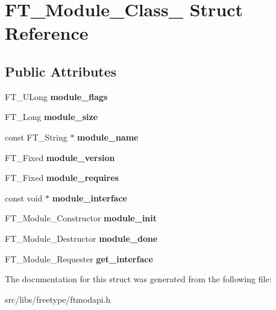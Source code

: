 \hypertarget{struct_f_t___module___class__}{
\section{FT\_\-Module\_\-Class\_\- Struct Reference}
\label{struct_f_t___module___class__}
}
\subsection*{Public Attributes}
\begin{DoxyCompactItemize}
\item 
\hypertarget{struct_f_t___module___class___a54a02a3767955cd8fa0cd786bd1f9515}{
FT\_\-ULong {\bfseries module\_\-flags}}
\label{struct_f_t___module___class___a54a02a3767955cd8fa0cd786bd1f9515}

\item 
\hypertarget{struct_f_t___module___class___a2582eeab364e4fbbd5d1e420bfcf3207}{
FT\_\-Long {\bfseries module\_\-size}}
\label{struct_f_t___module___class___a2582eeab364e4fbbd5d1e420bfcf3207}

\item 
\hypertarget{struct_f_t___module___class___af25b9e32b6c91e0c31560efb62886ed7}{
const FT\_\-String $\ast$ {\bfseries module\_\-name}}
\label{struct_f_t___module___class___af25b9e32b6c91e0c31560efb62886ed7}

\item 
\hypertarget{struct_f_t___module___class___a5b649f1965c42fd8c54bbc370fbf60b4}{
FT\_\-Fixed {\bfseries module\_\-version}}
\label{struct_f_t___module___class___a5b649f1965c42fd8c54bbc370fbf60b4}

\item 
\hypertarget{struct_f_t___module___class___a24772981bd972d342f54a6e1704f85c3}{
FT\_\-Fixed {\bfseries module\_\-requires}}
\label{struct_f_t___module___class___a24772981bd972d342f54a6e1704f85c3}

\item 
\hypertarget{struct_f_t___module___class___a320168f227e2d268691429ac0c6b2900}{
const void $\ast$ {\bfseries module\_\-interface}}
\label{struct_f_t___module___class___a320168f227e2d268691429ac0c6b2900}

\item 
\hypertarget{struct_f_t___module___class___a60f2bb9eee68366f20fe0613f347ffbd}{
FT\_\-Module\_\-Constructor {\bfseries module\_\-init}}
\label{struct_f_t___module___class___a60f2bb9eee68366f20fe0613f347ffbd}

\item 
\hypertarget{struct_f_t___module___class___ab6e9c780519e24a51144df79692cf339}{
FT\_\-Module\_\-Destructor {\bfseries module\_\-done}}
\label{struct_f_t___module___class___ab6e9c780519e24a51144df79692cf339}

\item 
\hypertarget{struct_f_t___module___class___aa72d79fcd0991231e24e88f359244e8e}{
FT\_\-Module\_\-Requester {\bfseries get\_\-interface}}
\label{struct_f_t___module___class___aa72d79fcd0991231e24e88f359244e8e}

\end{DoxyCompactItemize}


The documentation for this struct was generated from the following file:\begin{DoxyCompactItemize}
\item 
src/libs/freetype/ftmodapi.h\end{DoxyCompactItemize}
